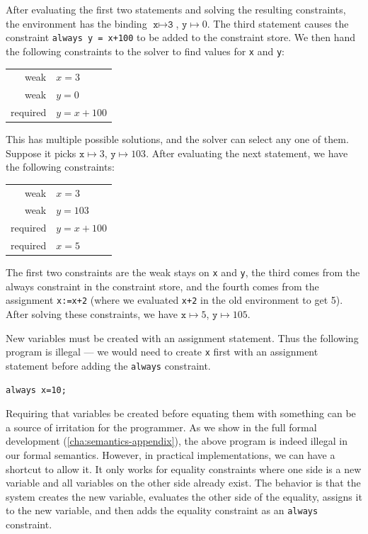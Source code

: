 After evaluating the first two statements and solving the resulting
constraints, the environment has the binding 
$\texttt{x} \mapsto \texttt{3}$, $\texttt{y} \mapsto 0$.  The third
statement causes the constraint \verb|always y = x+100| to be added to
the constraint store.  We then hand the following constraints to the
solver to find values for \texttt{x} and \texttt{y}:
\begin{center}
\begin{tabular}{rl}
weak     & $x=3$ \\
weak     & $y=0$ \\
required & $y=x+100$
\end{tabular}
\end{center}
This has multiple possible solutions, and the solver can select any
one of them.  Suppose it picks $\texttt{x} \mapsto 3$,
$\texttt{y} \mapsto 103$. After evaluating the next statement, we have
the following constraints:
\begin{center}
\begin{tabular}{rl}
weak     & $x=3$ \\
weak     & $y=103$ \\
required & $y=x+100$ \\
required & $x=5$
\end{tabular}
\end{center}
The first two constraints are the weak stays on \verb|x| and \verb|y|,
the third comes from the always constraint in the constraint store,
and the fourth comes from the assignment \verb|x:=x+2| (where we
evaluated \verb|x+2| in the old environment to get 5).  After solving
these constraints, we have $\texttt{x} \mapsto 5$, 
$\texttt{y} \mapsto 105$.

New variables must be created with an assignment statement.  Thus
the following program is illegal --- we would need to create
\verb|x| first with an assignment statement before adding the
\verb|always| constraint.
\begin{lstlisting}
always x=10;
\end{lstlisting}

Requiring that variables be created before equating them with something can be a
source of irritation for the programmer. As we show in the full formal
development (\autoref{cha:semantics-appendix}), the above program is indeed
illegal in our formal semantics.  However, in practical implementations, we can
have a shortcut to allow it.  It only works for equality constraints where one
side is a new variable and all variables on the other side already exist.  The
behavior is that the system creates the new variable, evaluates the other side
of the equality, assigns it to the new variable, and then adds the equality
constraint as an \verb|always| constraint.

